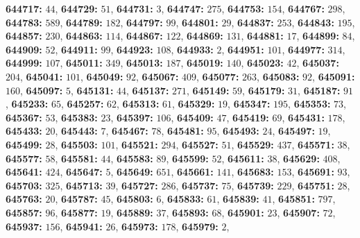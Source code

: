 \textsf{\bfseries 644717:} $44$, \textsf{\bfseries 644729:} $51$, \textsf{\bfseries 644731:} $3$, \textsf{\bfseries 644747:} $275$, \textsf{\bfseries 644753:} $154$, \textsf{\bfseries 644767:} $298$, \textsf{\bfseries 644783:} $589$, \textsf{\bfseries 644789:} $182$, \textsf{\bfseries 644797:} $99$, \textsf{\bfseries 644801:} $29$, \textsf{\bfseries 644837:} $253$, \textsf{\bfseries 644843:} $195$, \textsf{\bfseries 644857:} $230$, \textsf{\bfseries 644863:} $114$, \textsf{\bfseries 644867:} $122$, \textsf{\bfseries 644869:} $131$, \textsf{\bfseries 644881:} $17$, \textsf{\bfseries 644899:} $84$, \textsf{\bfseries 644909:} $52$, \textsf{\bfseries 644911:} $99$, \textsf{\bfseries 644923:} $108$, \textsf{\bfseries 644933:} $2$, \textsf{\bfseries 644951:} $101$, \textsf{\bfseries 644977:} $314$, \textsf{\bfseries 644999:} $107$, \textsf{\bfseries 645011:} $349$, \textsf{\bfseries 645013:} $187$, \textsf{\bfseries 645019:} $140$, \textsf{\bfseries 645023:} $42$, \textsf{\bfseries 645037:} $204$, \textsf{\bfseries 645041:} $101$, \textsf{\bfseries 645049:} $92$, \textsf{\bfseries 645067:} $409$, \textsf{\bfseries 645077:} $263$, \textsf{\bfseries 645083:} $92$, \textsf{\bfseries 645091:} $160$, \textsf{\bfseries 645097:} $5$, \textsf{\bfseries 645131:} $44$, \textsf{\bfseries 645137:} $271$, \textsf{\bfseries 645149:} $59$, \textsf{\bfseries 645179:} $31$, \textsf{\bfseries 645187:} $91$, \textsf{\bfseries 645233:} $65$, \textsf{\bfseries 645257:} $62$, \textsf{\bfseries 645313:} $61$, \textsf{\bfseries 645329:} $19$, \textsf{\bfseries 645347:} $195$, \textsf{\bfseries 645353:} $73$, \textsf{\bfseries 645367:} $53$, \textsf{\bfseries 645383:} $23$, \textsf{\bfseries 645397:} $106$, \textsf{\bfseries 645409:} $47$, \textsf{\bfseries 645419:} $69$, \textsf{\bfseries 645431:} $178$, \textsf{\bfseries 645433:} $20$, \textsf{\bfseries 645443:} $7$, \textsf{\bfseries 645467:} $78$, \textsf{\bfseries 645481:} $95$, \textsf{\bfseries 645493:} $24$, \textsf{\bfseries 645497:} $19$, \textsf{\bfseries 645499:} $28$, \textsf{\bfseries 645503:} $101$, \textsf{\bfseries 645521:} $294$, \textsf{\bfseries 645527:} $51$, \textsf{\bfseries 645529:} $437$, \textsf{\bfseries 645571:} $38$, \textsf{\bfseries 645577:} $58$, \textsf{\bfseries 645581:} $44$, \textsf{\bfseries 645583:} $89$, \textsf{\bfseries 645599:} $52$, \textsf{\bfseries 645611:} $38$, \textsf{\bfseries 645629:} $408$, \textsf{\bfseries 645641:} $424$, \textsf{\bfseries 645647:} $5$, \textsf{\bfseries 645649:} $651$, \textsf{\bfseries 645661:} $141$, \textsf{\bfseries 645683:} $153$, \textsf{\bfseries 645691:} $93$, \textsf{\bfseries 645703:} $325$, \textsf{\bfseries 645713:} $39$, \textsf{\bfseries 645727:} $286$, \textsf{\bfseries 645737:} $75$, \textsf{\bfseries 645739:} $229$, \textsf{\bfseries 645751:} $28$, \textsf{\bfseries 645763:} $20$, \textsf{\bfseries 645787:} $45$, \textsf{\bfseries 645803:} $6$, \textsf{\bfseries 645833:} $61$, \textsf{\bfseries 645839:} $41$, \textsf{\bfseries 645851:} $797$, \textsf{\bfseries 645857:} $96$, \textsf{\bfseries 645877:} $19$, \textsf{\bfseries 645889:} $37$, \textsf{\bfseries 645893:} $68$, \textsf{\bfseries 645901:} $23$, \textsf{\bfseries 645907:} $72$, \textsf{\bfseries 645937:} $156$, \textsf{\bfseries 645941:} $26$, \textsf{\bfseries 645973:} $178$, \textsf{\bfseries 645979:} $2$, 
